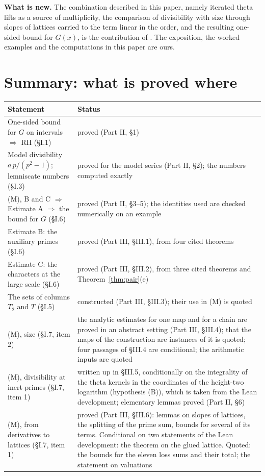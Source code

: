 \documentclass[11pt,letterpaper]{article}
\begin{document}
\textbf{What is new.} The combination described in this paper, namely iterated theta lifts as a source of
multiplicity, the comparison of divisibility with size through slopes of lattices carried to the term
linear in the order, and the resulting one-sided bound for $G(x)$, is the contribution of \cite{Alp26}.
The exposition, the worked examples and the computations in this paper are ours.

\section{Summary: what is proved where}

\begin{center}\small
\begin{tabular}{p{}p{}}
\toprule
Statement & Status\\
\midrule
One-sided bound for $G$ on intervals $\Rightarrow$ RH (\S I.1) & proved (Part II, \S1)\\
Model divisibility $a\,p/(p^2-1)$; lemniscate numbers (\S I.3) & proved for the model series (Part II, \S2); the numbers computed exactly\\
(M), B and C $\Rightarrow$ Estimate A $\Rightarrow$ the bound for $G$ (\S I.6) & proved (Part II, \S3--5); the identities used are checked numerically on an example\\
Estimate B: the auxiliary primes (\S I.6) & proved (Part III, \S III.1), from four cited theorems\\
Estimate C: the characters at the large scale (\S I.6) & proved (Part III, \S III.2), from three cited theorems and Theorem~\ref{thm:pair}(e)\\
The sets of columns $T_2$ and $T$ (\S I.5) & constructed (Part III, \S III.3); their use in (M) is quoted\\
(M), size (\S I.7, item 2) & the analytic estimates for one map and for a chain are proved in an abstract setting (Part III, \S III.4); that the maps of the construction are instances of it is quoted; four passages of \S III.4 are conditional; the arithmetic inputs are quoted\\
(M), divisibility at inert primes (\S I.7, item 1) & written up in \S III.5, conditionally on the integrality of the theta kernels in the coordinates of the height-two logarithm (hypothesis (B)), which is taken from the Lean development; elementary lemmas proved (Part II, \S6)\\
(M), from derivatives to lattices (\S I.7, item 1) & proved (Part III, \S III.6): lemmas on slopes of lattices, the splitting of the prime sum, bounds for several of its terms. Conditional on two statements of the Lean development: the theorem on the glued lattice. Quoted: the bounds for the eleven loss sums and their total; the statement on valuations\\

\end{tabular}
\end{center}
\end{document}
